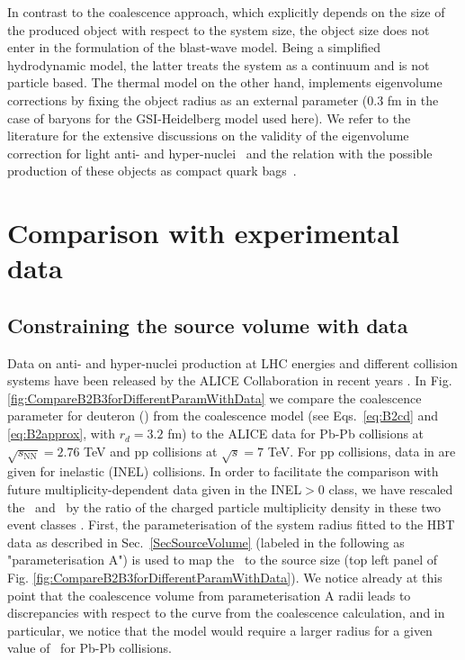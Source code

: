 \documentclass[a4paper,11pt]{scrartcl}
\begin{document}
In contrast to the coalescence approach, which explicitly depends on the size of the produced object with respect to the system size, the object size does not enter in the formulation of the blast-wave model. Being a simplified hydrodynamic model, the latter treats the system as a continuum and is not particle based. The thermal model on the other hand, implements eigenvolume corrections by fixing the object radius as an external parameter (0.3 fm in the case of baryons for the GSI-Heidelberg model used here). We refer to the literature for the extensive discussions on the validity of the eigenvolume correction for light anti- and hyper-nuclei~\cite{Vovchenko:2016mwg} and the relation with the possible production of these objects as compact quark bags~\cite{Andronic:2017}.


\section{Comparison with experimental data}\label{sec:comparison}

\subsection{Constraining the source volume with data}\label{sec:radiiParamet}

Data on anti- and hyper-nuclei production at LHC energies and different collision systems have been released by the ALICE Collaboration in recent years \cite{ALICE:nucleipp2017,ALICE:deuteronppPbPb2015,Acharya:2017dmc, Adam:2015yta}. 
In Fig. \ref{fig:CompareB2B3forDifferentParamWithData} we compare the coalescence parameter for deuteron (\btwo) from the coalescence model (see Eqs.~\ref{eq:B2cd} and \ref{eq:B2approx}, with $r_{d} = 3.2$ fm) to the ALICE data for Pb-Pb collisions at $\sqrt{s_{\mathrm{NN}}} = 2.76$ TeV and pp collisions at $\sqrt{s} = 7$ TeV. For pp collisions, data in  \cite{ALICE:nucleipp2017} are given for inelastic (INEL) collisions. In order to facilitate the comparison with future multiplicity-dependent data given in the INEL$>$0 class, we have rescaled the \btwo~and \bthree~by the ratio of the charged particle multiplicity density in these two event classes \cite{Adam:2015gka}.
First, the parameterisation of the system radius fitted to the HBT data as described in Sec.~\ref{SecSourceVolume} (labeled in the following as "parameterisation A") is used to map the \avdNdeta~to the source size (top left panel of Fig. \ref{fig:CompareB2B3forDifferentParamWithData}). 
We notice already at this point that the coalescence volume from parameterisation A radii leads to discrepancies with respect to the curve from the coalescence calculation, and in particular, we notice that the model would require a larger radius for a given value of \btwo~for Pb-Pb collisions.
\end{document}
